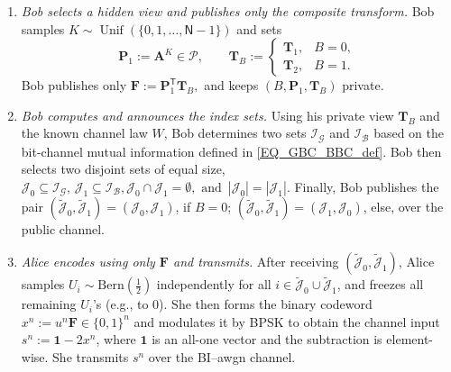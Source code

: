 \documentclass[onecolumn]{IEEEtran} %
\newcommand{\bA}{\mathbf A}
\newcommand{\bP}{\mathbf P}
\newcommand{\bF}{\mathbf F}
\newcommand{\1}{\mathbbm{1}}
\theoremstyle{boldremark}
\newcommand{\bT}{\mathbf{T}}
\DeclareMathOperator{\Unif}{Unif}
\begin{document}
\begin{enumerate}
  \item \textit{Bob selects a hidden view and publishes only the composite transform.}
  Bob samples $K\sim\Unif(\{0,1,\dots,\textsf{N}-1\})$ and sets
  \[
    \bP_1 := \bA^K \in \mathcal{P},
    \qquad
    \bT_B :=
    \begin{cases}
      \bT_1, & B=0,\\
      \bT_2, & B=1.
    \end{cases}
  \]
  Bob\! publishes\! only \!$\bF\!:=\! \bP_1^{\mathsf T}\bT_B,\!$ and keeps $(B,\bP_1,\bT_B)$ private.

  \item \textit{Bob computes and announces the index sets.}
  Using his private view $\bT_B$ and the known channel law $W$, Bob determines two sets
  $\mathcal{I}_{\mathcal G}$ and $\mathcal{I}_{\mathcal B}$ based on the bit-channel mutual information defined in \eqref{EQ_GBC_BBC_def}. Bob then selects two disjoint sets of equal size,
  $  \mathcal{J}_0 \subseteq \mathcal{I}_{\mathcal G},
  \,  \mathcal{J}_1 \subseteq \mathcal{I}_{\mathcal B}, \mathcal{J}_0\cap \mathcal{J}_1=\emptyset,\mbox{ and }
  \,  |\mathcal{J}_0|=|\mathcal{J}_1|.$
  Finally, Bob publishes the pair
  $(\tilde{\mathcal{J}}_{0},\tilde{\mathcal{J}}_{1})=(\mathcal{J}_{0},\mathcal{J}_{1})$, if $B=0$;
  $(\tilde{\mathcal{J}}_{0},\tilde{\mathcal{J}}_{1})=(\mathcal{J}_{1},\mathcal{J}_{0})$, else, over the public channel.


\item \textit{Alice encodes using only $\bF$ and transmits.}
After receiving $(\tilde{\mathcal{J}}_{0},\tilde{\mathcal{J}}_{1})$, Alice samples
$U_i\sim\mathrm{Bern}(\tfrac12)$ independently for all
$i\in \tilde{\mathcal{J}}_{0}\cup\tilde{\mathcal{J}}_{1}$,
and freezes all remaining $U_i$'s (e.g., to $0$).
She then forms the binary codeword
\(x^n := u^n\bF \in\{0,1\}^n\) and modulates it by BPSK to obtain the channel input
\(s^n := \mathbf 1 - 2x^n\), where $\mathbf 1$ is an all-one vector and the subtraction is element-wise.
She transmits \(s^n\) over the BI--\gls{awgn} channel.


\end{enumerate}
\end{document}
